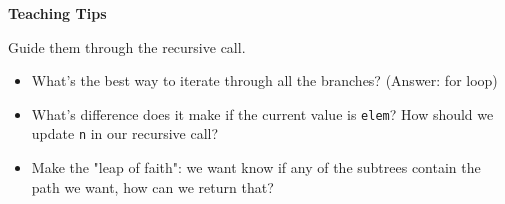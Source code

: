 \begin{guide}
\begin{blocksection}
\textbf{Teaching Tips}

\item Guide them through the recursive call.
\begin{itemize}
	\item What's the best way to iterate through all the branches? (Answer: for loop)
	\item What's difference does it make if the current value is \lstinline{elem}? How should we update \lstinline{n} in our recursive call?
	\item Make the "leap of faith": we want know if any of the subtrees contain the path we want, how can we return that?
\end{itemize}
\end{blocksection}
\end{guide}
